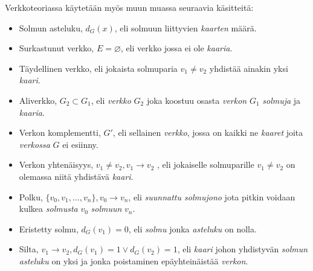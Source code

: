   Verkkoteoriassa käytetään myös muun muassa seuraavia käsitteitä:
  \begin{itemize}
    \item Solmun asteluku, \(d_G(x)\), eli solmuun liittyvien \emph{kaarten} määrä.
    \item Surkastunut verkko, \(E = \varnothing \), eli verkko jossa ei ole \emph{kaaria}.
    \item Täydellinen verkko, eli jokaista solmuparia \(v_1 \neq v_2\) yhdistää ainakin yksi \emph{kaari}.
    \item Aliverkko, \(G_2 \subset G_1\), eli \emph{verkko} \(G_2\) joka koostuu osasta \emph{verkon} \(G_1\) \emph{solmuja} ja \emph{kaaria}.
    \item Verkon komplementti, \(G'\), eli sellainen \emph{verkko}, jossa on kaikki ne \emph{kaaret} joita \emph{verkossa} \(G\) ei esiinny.
    \item Verkon yhtenäisyys, \(v_1 \neq v_2, v_1 \rightarrow v_2\) , eli jokaiselle solmuparille \(v_1 \neq v_2\) on olemassa niitä yhdistävä \emph{kaari}.
    \item Polku, \(\{v_0, v_1, ..., v_n\}, v_0 \rightarrow v_n\), eli \emph{suunnattu solmujono} jota pitkin voidaan kulkea \emph{solmusta} \(v_0\) \emph{solmuun} \(v_n\).
    \item Eristetty solmu, \(d_G(v_1) = 0\), eli \emph{solmu} jonka \emph{asteluku} on nolla.
    \item Silta, \(v_1 \rightarrow v_2, d_G(v_1) = 1 \lor d_G(v_2) = 1\), eli \emph{kaari} johon yhdistyvän \emph{solmun asteluku} on yksi ja jonka poistaminen epäyhteinäistää \emph{verkon}.

\end{itemize}
